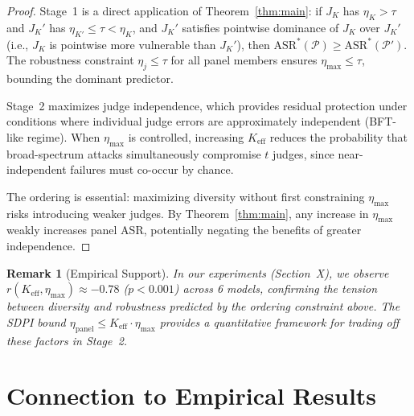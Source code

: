 \documentclass[11pt]{article}
\newtheorem*{remark}{Remark}
\begin{document}
\begin{proof}
Stage~1 is a direct application of Theorem~\ref{thm:main}: if $J_K$ has $\eta_K > \tau$ and $J_K'$ has $\eta_{K'} \leq \tau < \eta_K$, and $J_K'$ satisfies pointwise dominance of $J_K$ over $J_K'$ (i.e., $J_K$ is pointwise more vulnerable than $J_K'$), then $\mathrm{ASR}^*(\mathcal{P}) \geq \mathrm{ASR}^*(\mathcal{P}')$. The robustness constraint $\eta_j \leq \tau$ for all panel members ensures $\eta_{\max} \leq \tau$, bounding the dominant predictor.

Stage~2 maximizes judge independence, which provides residual protection under conditions where individual judge errors are approximately independent (BFT-like regime). When $\eta_{\max}$ is controlled, increasing $K_{\mathrm{eff}}$ reduces the probability that broad-spectrum attacks simultaneously compromise $t$ judges, since near-independent failures must co-occur by chance.

The ordering is essential: maximizing diversity without first constraining $\eta_{\max}$ risks introducing weaker judges. By Theorem~\ref{thm:main}, any increase in $\eta_{\max}$ weakly increases panel ASR, potentially negating the benefits of greater independence.
\end{proof}

\begin{remark}[Empirical Support]
In our experiments (Section~X), we observe $r(K_{\mathrm{eff}}, \eta_{\max}) \approx -0.78$ ($p < 0.001$) across 6 models, confirming the tension between diversity and robustness predicted by the ordering constraint above. The SDPI bound $\eta_{\mathrm{panel}} \leq K_{\mathrm{eff}} \cdot \eta_{\max}$ provides a quantitative framework for trading off these factors in Stage~2.
\end{remark}


\section{Connection to Empirical Results}
\end{document}
